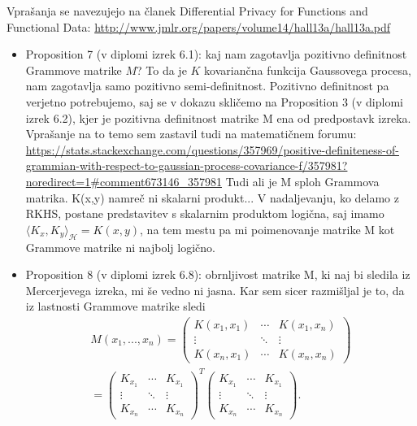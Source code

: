 \documentclass[12pt,a4paper]{amsart}
\theoremstyle{definition} %
\theoremstyle{plain} %
\begin{document}
Vprašanja se navezujejo na članek Differential Privacy for Functions and Functional Data: \url{http://www.jmlr.org/papers/volume14/hall13a/hall13a.pdf}
\newline
\begin{itemize}
\item Proposition 7 (v diplomi izrek 6.1): kaj nam zagotavlja pozitivno definitnost Grammove matrike $M$? To da je $K$ kovariančna funkcija Gaussovega procesa, nam zagotavlja samo pozitivno semi-definitnost. Pozitivno definitnost pa verjetno potrebujemo, saj se v dokazu skličemo na Proposition 3 (v diplomi izrek 6.2), kjer je pozitivna definitnost matrike M ena od predpostavk izreka. Vprašanje na to temo sem zastavil tudi na matematičnem forumu: \url{https://stats.stackexchange.com/questions/357969/positive-definiteness-of-grammian-with-respect-to-gaussian-process-covariance-f/357981?noredirect=1#comment673146_357981}
\newline
\newline
Tudi ali je M sploh Grammova matrika. K(x,y) namreč ni skalarni produkt... V nadaljevanju, ko delamo z RKHS, postane predstavitev s skalarnim produktom logična, saj imamo $\langle K_x, K_y \rangle_{\mathcal{H}} = K(x,y)$, na tem mestu pa mi poimenovanje matrike M kot Grammove matrike ni najbolj logično.
\newline
\item Proposition 8  (v diplomi izrek 6.8): obrnljivost matrike M, ki naj bi sledila iz Mercerjevega izreka, mi še vedno ni jasna. Kar sem sicer razmišljal je to, da iz lastnosti Grammove matrike sledi 
\begin{gather*}
M(x_1,...,x_n) = 
 \begin{pmatrix}
  K(x_1,x_1) & \cdots & K(x_1,x_n) \\
  \vdots    & \ddots & \vdots  \\
  K(x_n,x_1) & \cdots & K(x_n,x_n) 
 \end{pmatrix} \\ = 
  \begin{pmatrix}
  K_{x_1} & \cdots & K_{x_1} \\
  \vdots    & \ddots & \vdots  \\
  K_{x_n} & \cdots & K_{x_n} 
 \end{pmatrix}^T 
  \begin{pmatrix}
  K_{x_1} & \cdots & K_{x_1} \\
  \vdots    & \ddots & \vdots  \\
  K_{x_n} & \cdots & K_{x_n} 
 \end{pmatrix}.

\end{gather*}
\end{itemize}
\end{document}
